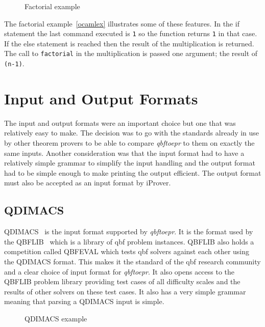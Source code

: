\begin{figure}[H]
\caption{Factorial example}
\begin{CenteredBox}

\end{CenteredBox}
\end{figure}

The factorial example~\ref{ocamlex} illustrates some of these features. In the if statement the last command executed is \texttt{1} so the function returns \texttt{1} in that case. If the else statement is reached then the result of the multiplication is returned. The call to \texttt{factorial} in the multiplication is passed one argument; the result of \texttt{(n-1)}.

\section{Input and Output Formats}
The input and output formats were an important choice but one that was relatively easy to make. The decision was to go with the standards already in use by other theorem provers to be able to compare \textit{qbftoepr} to them on exactly the same inputs. Another consideration was that the input format had to have a relatively simple grammar to simplify the input handling and the output format had to be simple enough to make printing the output efficient. The output format must also be accepted as an input format by iProver.

\subsection{QDIMACS}
QDIMACS~\cite{qdimacs} is the input format supported by \textit{qbftoepr}. It is the format used by the QBFLIB~\cite{qbflib} which is a library of \gls{qbf} problem instances. QBFLIB also holds a competition called QBFEVAL which tests \gls{qbf} solvers against each other using the QDIMACS format. This makes it the standard of the \gls{qbf} research community and a clear choice of input format for \textit{qbftoepr}. It also opens access to the QBFLIB problem library providing test cases of all difficulty scales and the results of other solvers on these test cases. It also has a very simple grammar meaning that parsing a QDIMACS input is simple.

\begin{figure}[H]
\caption{QDIMACS example}
\begin{CenteredBox}

\end{CenteredBox}
\end{figure}

